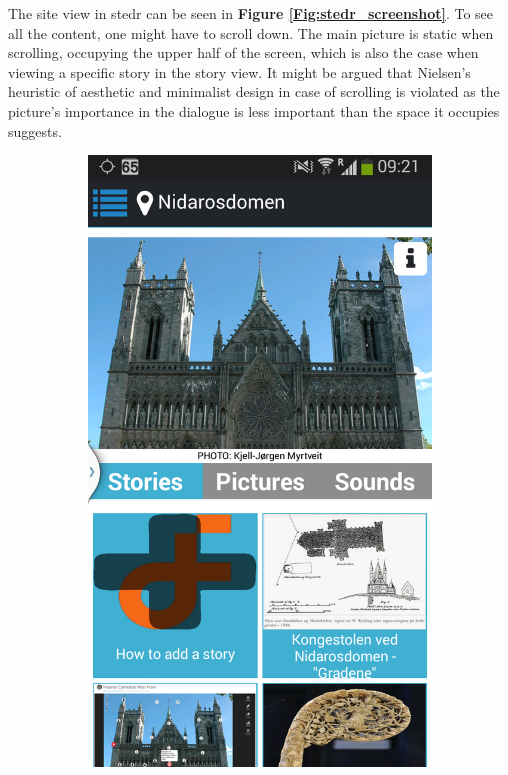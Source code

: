 The site view in stedr can be seen in \textbf{Figure \ref{Fig:stedr_screenshot}}. To see all the content, one might have to scroll down. The main picture is static when scrolling, occupying the upper half of the screen, which is also the case when viewing a specific story in the story view. It might be argued that Nielsen's heuristic of aesthetic and minimalist design in case of scrolling is violated as the picture's importance in the dialogue is less important than the space it occupies suggests. \newline

\begin{figure}[h]
	\centering
	\begin{subfigure}[t]{0.3\textwidth}
		\includegraphics[width=\textwidth]{fig/stedr_screenshot}

\end{subfigure}
\end{figure}
